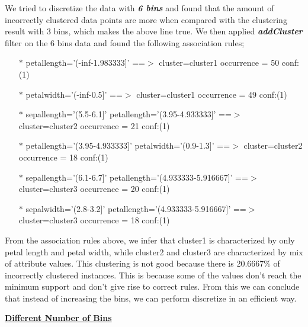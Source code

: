\documentclass[a4paper,10pt]{article}
\begin{document}
We tried to discretize the data with \textbf{\textit{6 bins}} and found that the amount of incorrectly clustered
data points are more when compared with the clustering result with 3 bins, which makes the above line true. We then
applied \textbf{\textit{addCluster}} filter on the 6 bins data and found the following association rules;
\begin{enumerate}
  \item [$*$] petallength='(-inf-1.983333]' ==$>$ cluster=cluster1 occurrence = 50    conf:(1)
  \item [$*$] petalwidth='(-inf-0.5]' ==$>$ cluster=cluster1 occurrence = 49    conf:(1)
  \item [$*$] sepallength='(5.5-6.1]' petallength='(3.95-4.933333]' ==$>$ cluster=cluster2 occurrence = 21    conf:(1)
  \item [$*$] petallength='(3.95-4.933333]' petalwidth='(0.9-1.3]' ==$>$ cluster=cluster2 occurrence = 18    conf:(1)
  \item [$*$] sepallength='(6.1-6.7]' petallength='(4.933333-5.916667]' ==$>$ cluster=cluster3 occurrence = 20    conf:(1)
  \item [$*$] sepalwidth='(2.8-3.2]' petallength='(4.933333-5.916667]' ==$>$ cluster=cluster3 occurrence = 18    conf:(1)
\end{enumerate}
From the association rules above, we infer that cluster1 is characterized by only petal length and petal width, while
cluster2 and cluster3 are characterized by mix of attribute values. This clustering is not good because there is 20.6667\% 
of incorrectly clustered instances. This is because some of the values don't reach the minimum support and don't
give rise to correct rules. From this we can conclude that instead of increasing the bins, we can perform discretize
in an efficient way.
\par
\textbf{\underline{Different Number of Bins}} \par
\end{document}
